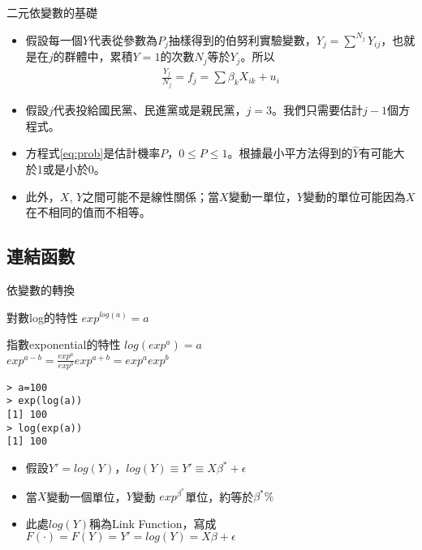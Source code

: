 \documentclass[border=10pt]{beamer}
\begin{document}
\begin{frame}{二元依變數的基礎}
\begin{itemize}
\item 假設每一個$Y$代表從參數為$P_{j}$抽樣得到的伯努利實驗變數，$Y_{j}=\sum^{N_{j}} Y_{ij}$，也就是在$j$的群體中，累積$Y=1$的次數$N_{j}$等於$Y_{j}$。所以
\begin{align}
 \frac{Y_{j}}{N_{j}}=f_{j}= \sum \beta_{k}X_{ik}+u_{i}
 \label{eq:prob}
\end{align}
\item 假設$j$代表投給國民黨、民進黨或是親民黨，$j=3$。我們只需要估計$j-1$個方程式。
\item 方程式\large{\ref{eq:prob}}是估計機率$P$，$0\leq P\leq 1$。根據最小平方法得到的$\hat{Y}$有可能大於1或是小於0。
\item 此外，$X$, $Y$之間可能不是線性關係；當$X$變動一單位，$Y$變動的單位可能因為$X$在不相同的值而不相等。
\end{itemize}
\end{frame}
\subsection{連結函數}
\begin{frame}[fragile=singleslide]{依變數的轉換}
\begin{exampleblock}{對數log的特性} 
$exp^{log(a)} = a$
\end{exampleblock}
\begin{exampleblock}{指數exponential的特性}
$log(exp^{a})=a$ \\
$exp^{a-b}=\frac{exp^{a}}{exp^{b}}$\hspace{2em}$exp^{a+b}=exp^{a}exp^{b}$
 \end{exampleblock}
\begin{Verbatim}[label=\textit{R code}, formatcom=\color{yellow}, frame=single]
> a=100
> exp(log(a))
[1] 100
> log(exp(a))
[1] 100
\end{Verbatim}
\begin{itemize}
\item 假設$Y'=log(Y)$，$log(Y)\equiv Y'\equiv X\beta^{*}+\epsilon$
\item 當$X$變動一個單位，$Y$變動 $exp^{\beta^{*}}$單位，約等於$\beta^{*}\%$
\item 此處$log(Y)$稱為Link Function，寫成$F(\cdot)=F(Y)=Y'=log(Y) = X\beta+\epsilon$

\end{itemize}
\end{frame}
\end{document}
